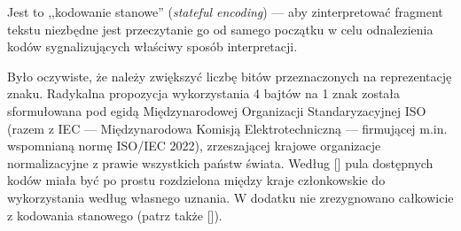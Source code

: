 
Jest to ,,kodowanie stanowe'' (\textit{stateful encoding}) --- aby
zinterpretować fragment tekstu niezbędne jest przeczytanie go od
samego początku w celu odnalezienia kodów sygnalizujących właściwy
sposób interpretacji.












Było oczywiste, że należy zwiększyć liczbę bitów przeznaczonych na
reprezentację znaku. Radykalna propozycja wykorzystania 4 bajtów na 1
znak została sformułowana pod egidą Międzynarodowej Organizacji
Standaryzacyjnej ISO (razem z IEC --- Międzynarodowa Komisją
Elektrotechniczną --- firmującej m.in. wspomnianą normę ISO/IEC 2022),
zrzeszającej krajowe organizacje normalizacyjne z prawie wszystkich
państw świata. Według [\cite{Pike93}] pula dostępnych kodów miała być po prostu
rozdzielona między kraje członkowskie do wykorzystania według własnego
uznania. W dodatku nie zrezygnowano całkowicie z kodowania stanowego
(patrz także  [\cite{wiki:ISO10646:2020}]).

